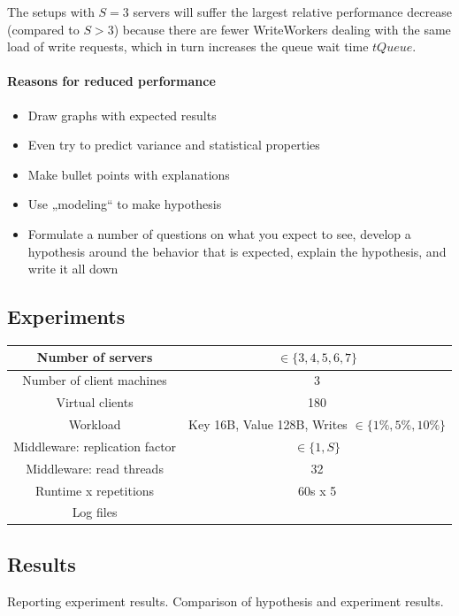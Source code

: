 \documentclass[11pt]{article}
\newcommand{\todo}[1]{\fcolorbox{black}{Apricot}{TODO: #1}}
\begin{document}
The setups with $S=3$ servers will suffer the largest relative performance decrease (compared to $S > 3$) because there are fewer WriteWorkers dealing with the same load of write requests, which in turn increases the queue wait time $tQueue$.

\paragraph{Reasons for reduced performance}


\begin{itemize}
\item Draw graphs with expected results
\item Even try to predict variance and statistical properties
\item Make bullet points with explanations
\item Use „modeling“ to make hypothesis
\item Formulate a number of questions on what you expect to see, develop a hypothesis around the behavior that is expected, explain the hypothesis, and write it all down
\end{itemize}

\subsection{Experiments}
\begin{center}
\small{
\smallskip
\begin{tabular}{|c|c|}
\hline Number of servers & $\in \{3, 4, 5, 6, 7\}$ \\ 
\hline Number of client machines & 3 \\ 
\hline Virtual clients & 180 \\ 
\hline Workload & Key 16B, Value 128B, Writes $\in \{1\%, 5\%, 10\%\}$ \todo{} \\
\hline Middleware: replication factor & $\in \{1, S\}$ \\ 
\hline Middleware: read threads & 32 \\ 
\hline Runtime x repetitions & 60s x 5 \todo{} \\ 
\hline Log files & \todo{} \\
\hline 
\end{tabular} }
\end{center}

\subsection{Results}
Reporting experiment results. Comparison of hypothesis and experiment results.
\end{document}
